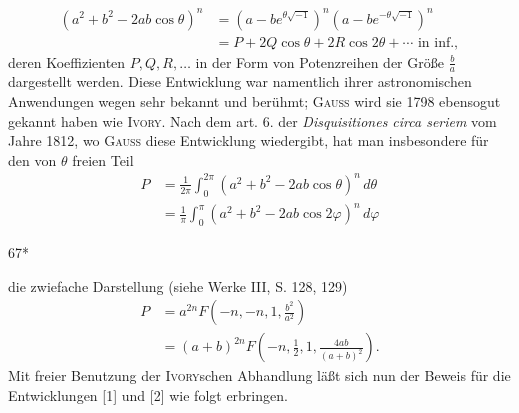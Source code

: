 \begin{equation}
\begin{aligned}
(a^2+b^2-2ab\cos\theta)^n&=(a-be^{\theta\sqrt{-1}})^n(a-be^{-\theta\sqrt{-1}})^n\\
&=P+2Q\cos\theta+2R\cos2\theta+\cdots\text{ in inf.},
\end{aligned}\tag*{(3)}
\end{equation}
\noindent deren Koeffizienten \(P,Q,R,\ldots\) in der Form von Potenzreihen der Größe \(\frac ba\) dargestellt werden. Diese Entwicklung war namentlich ihrer astronomischen Anwendungen wegen sehr bekannt und berühmt; \textsc{Gauss} wird sie 1798 ebensogut gekannt haben wie \textsc{Ivory}. Nach dem art. 6. der \textit{Disquisitiones circa seriem} vom Jahre 1812, wo \textsc{Gauss} diese Entwicklung wiedergibt, hat man insbesondere für den von \(\theta\) freien Teil
\begin{equation}
\begin{aligned}
P&=\frac1{2\pi}\int_0^{2\pi}(a^2+b^2-2ab\cos\theta)^n\,d\theta\\
&=\frac1\pi\int_0^\pi(a^2+b^2-2ab\cos2\varphi)^n\,d\varphi
\end{aligned}\tag*{(4)}
\end{equation}
\par\bigskip\noindent\hfill67*\hspace*{.14\linewidth}
\par\endgroup

\clearpage{}
\begingroup\small
\makeatletter\tagsleft@true\let\veqno\@@leqno\makeatother
\noindent die zwiefache Darstellung (siehe Werke III, S. 128, 129)
\begin{equation}
\begin{aligned}
P&=a^{2n}F\left(-n,-n,1,\frac{b^2}{a^2}\right)\\
&=(a+b)^{2n}F\left(-n,\frac12,1,\frac{4ab}{(a+b)^2}\right).
\end{aligned}\tag*{(5)}
\end{equation}
\noindent Mit freier Benutzung der \textsc{Ivory}schen Abhandlung läßt sich nun der Beweis für die Entwicklungen [1] und [2] wie folgt erbringen.

